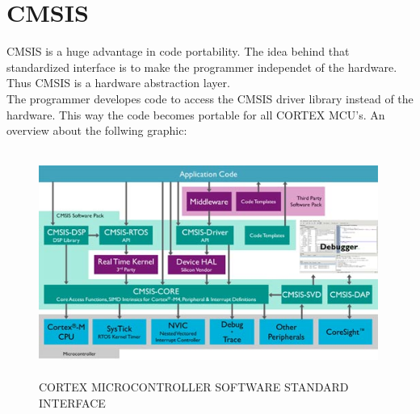 \chapter{CMSIS}
CMSIS is a huge advantage in code portability. The idea behind that standardized
interface is to make the programmer independet of the hardware. Thus CMSIS is a
hardware abstraction layer.\\
The programmer developes code to access the CMSIS driver library instead of the
hardware. This way the code becomes portable for all CORTEX MCU's.
An overview about the follwing graphic:\citep{ARM-CMSIS}\\

\begin{figure}[ht]
	\centering
	\includegraphics[width=420px, height=280px]{../img/cmsis.jpg}
	\caption{CORTEX MICROCONTROLLER SOFTWARE STANDARD INTERFACE}
	\label{cmsis_}
\end{figure}
